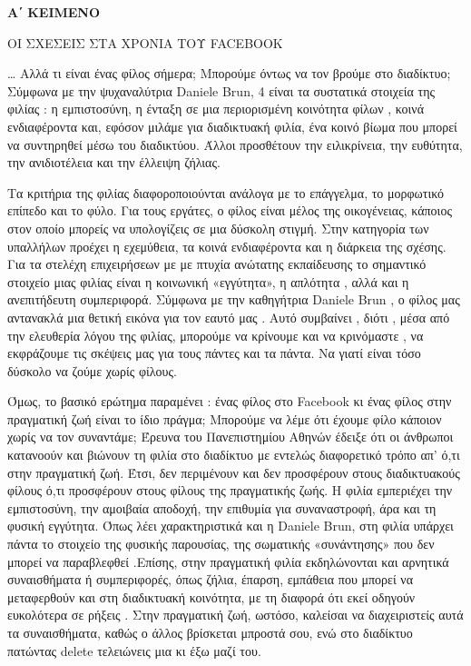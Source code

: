 \documentclass[twoside,nofonts,internet,fil,maria]{frontisthrio-diag}
\begin{document}
\textcolor{\xrwma}{\textbf{Α΄ ΚΕΙΜΕΝΟ}}
\begin{center}
ΟΙ ΣΧΕΣΕΙΣ ΣΤΑ ΧΡΟΝΙΑ ΤΟΥ FACEBOOK
\end{center}
… Αλλά τι είναι ένας φίλος σήμερα; Μπορούμε όντως να τον βρούμε στο διαδίκτυο;
Σύμφωνα με την ψυχαναλύτρια Daniele Brun, 4 είναι τα συστατικά στοιχεία της
φιλίας : η εμπιστοσύνη, η ένταξη σε μια περιορισμένη κοινότητα φίλων , κοινά
ενδιαφέροντα και, εφόσον μιλάμε για διαδικτυακή φιλία, ένα κοινό βίωμα που
μπορεί να συντηρηθεί μέσω του διαδικτύου. Άλλοι προσθέτουν την ειλικρίνεια, την
ευθύτητα, την ανιδιοτέλεια και την έλλειψη ζήλιας.

Τα κριτήρια της φιλίας διαφοροποιούνται ανάλογα με το επάγγελμα, το
μορφωτικό επίπεδο και το φύλο. Για τους εργάτες, ο φίλος είναι μέλος της
οικογένειας, κάποιος στον οποίο μπορείς να υπολογίζεις σε μια δύσκολη στιγμή.
Στην κατηγορία των υπαλλήλων προέχει η εχεμύθεια, τα κοινά ενδιαφέροντα και η
διάρκεια της σχέσης. Για τα στελέχη επιχειρήσεων με με πτυχία ανώτατης
εκπαίδευσης το σημαντικό στοιχείο μιας φιλίας είναι η κοινωνική «εγγύτητα», η
απλότητα , αλλά και η ανεπιτήδευτη συμπεριφορά.
Σύμφωνα με την καθηγήτρια Daniele Brun , ο φίλος μας αντανακλά μια θετική
εικόνα για τον εαυτό μας . Αυτό συμβαίνει , διότι , μέσα από την ελευθερία λόγου
της φιλίας, μπορούμε να κρίνουμε και να κρινόμαστε , να εκφράζουμε τις σκέψεις
μας για τους πάντες και τα πάντα. Να γιατί είναι τόσο δύσκολο να ζούμε χωρίς
φίλους.

Όμως, το βασικό ερώτημα παραμένει : ένας φίλος στο Facebook κι ένας φίλος
στην πραγματική ζωή είναι το ίδιο πράγμα; Μπορούμε να λέμε ότι έχουμε φίλο
κάποιον χωρίς να τον συναντάμε; Έρευνα του Πανεπιστημίου Αθηνών έδειξε ότι οι
άνθρωποι κατανοούν και βιώνουν τη φιλία στο διαδίκτυο με εντελώς διαφορετικό
τρόπο απ’ ό,τι στην πραγματική ζωή. Έτσι, δεν περιμένουν και δεν προσφέρουν
στους διαδικτυακούς φίλους ό,τι προσφέρουν στους φίλους της πραγματικής ζωής.
Η φιλία εμπεριέχει την εμπιστοσύνη, την αμοιβαία αποδοχή, την επιθυμία για
συναναστροφή, άρα και τη φυσική εγγύτητα. Όπως λέει χαρακτηριστικά και η
Daniele Brun, στη φιλία υπάρχει πάντα το στοιχείο της φυσικής παρουσίας, της
σωματικής «συνάντησης» που δεν μπορεί να παραβλεφθεί .Επίσης, στην
πραγματική φιλία εκδηλώνονται και αρνητικά συναισθήματα ή συμπεριφορές,
όπως ζήλια, έπαρση, εμπάθεια που μπορεί να μεταφερθούν και στη διαδικτυακή
κοινότητα, με τη διαφορά ότι εκεί οδηγούν ευκολότερα σε ρήξεις . Στην πραγματική
ζωή, ωστόσο, καλείσαι να διαχειριστείς αυτά τα συναισθήματα, καθώς ο άλλος
βρίσκεται μπροστά σου, ενώ στο διαδίκτυο πατώντας delete τελειώνεις μια κι έξω
μαζί του.
\end{document}
